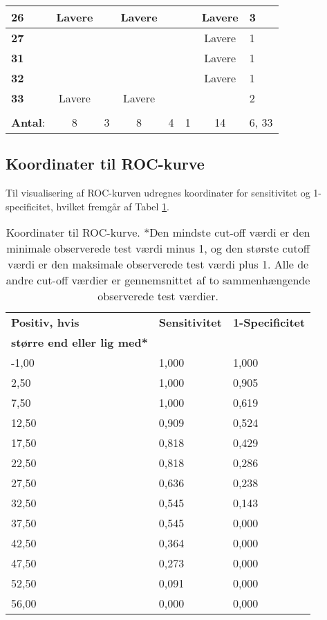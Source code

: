 \begin{table}[H]
\begin{tabular}{l|c|c|c|c|c|c|p{2cm}}
\cellcolor[HTML]{C0C0C0}\textbf{26} & Lavere & & Lavere & & & Lavere  & \cellcolor[HTML]{EFEFEF} 3\\\hline
\cellcolor[HTML]{C0C0C0}\textbf{27} & & &  &  & & Lavere  & \cellcolor[HTML]{EFEFEF} 1\\\hline
\cellcolor[HTML]{C0C0C0}\textbf{31} & & &  &  & & Lavere & \cellcolor[HTML]{EFEFEF} 1 \\\hline
\cellcolor[HTML]{C0C0C0}\textbf{32} & & & & & & Lavere & \cellcolor[HTML]{EFEFEF}1 \\\hline
\cellcolor[HTML]{C0C0C0}\textbf{33} & Lavere & & Lavere & & & & \cellcolor[HTML]{EFEFEF} 2\\\hline
\rowcolor[HTML]{EFEFEF}\multicolumn{8}{r}{\textbf{Gennemsnit}}\\
\rowcolor[HTML]{EFEFEF} \textbf{Antal}: & 8 & 3 & 8 & 4 & 1 & 14  & 6, 33\\
\end{tabular}
\end{table}

\subsection{Koordinater til ROC-kurve} \label{App:ROC}
Til visualisering af ROC-kurven udregnes koordinater for sensitivitet og 1-specificitet, hvilket fremgår af Tabel  \ref{table:app_ROC}.

\begin{table}[H]
\caption{Koordinater til ROC-kurve. *Den mindste cut-off værdi er den minimale observerede test værdi minus 1, og den største cutoff værdi er den maksimale observerede test værdi plus 1. Alle de andre cut-off værdier er gennemsnittet af to sammenhængende observerede test værdier.}
\vspace{2mm}
\label{table:app_ROC}
\centering
\begin{tabular}{p{3cm}|p{2.5cm}|p{2.5cm}}
\rowcolor[HTML]{C0C0C0}\textbf{Positiv, hvis} & \textbf{Sensitivitet} & \textbf{1-Specificitet} \\ 
\rowcolor[HTML]{C0C0C0} \textbf{større end eller lig med*} &  &    \\ \hline
-1,00 & 1,000 & 1,000 \\ \hline
2,50	& 1,000 & 0,905 \\ \hline
7,50 & 1,000 & 0,619 \\ \hline
12,50  & 0,909 & 0,524 \\ \hline
17,50 & 0,818 & 0,429 \\ \hline
22,50  & 0,818 & 0,286 \\ \hline
27,50  & 0,636 & 0,238 \\ \hline
32,50  & 0,545 & 0,143 \\ \hline
37,50  & 0,545 & 0,000 \\ \hline
42,50  & 0,364 & 0,000 \\ \hline
47,50 & 0,273 & 0,000 \\ \hline
52,50 & 0,091 & 0,000 \\ \hline
56,00 & 0,000 & 0,000  \\ \hline
\end{tabular}
\end{table}

